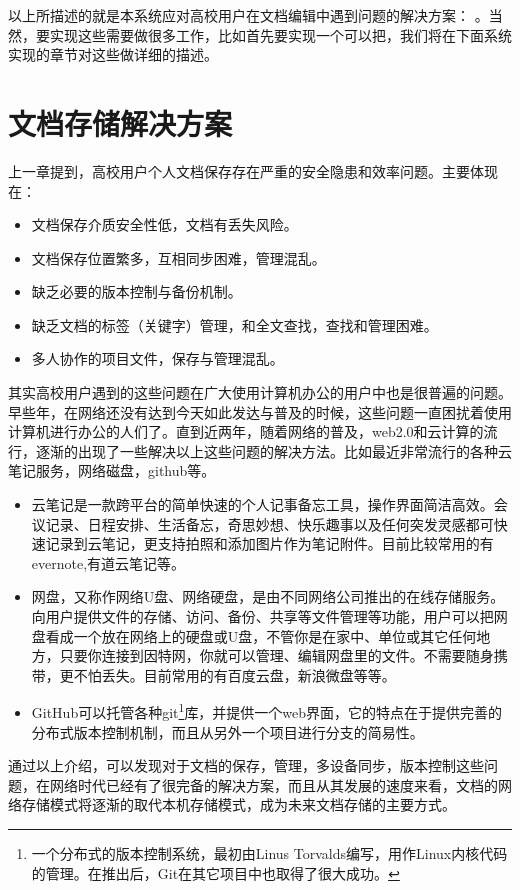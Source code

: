 以上所描述的就是本系统应对高校用户在文档编辑中遇到问题的解决方案： 。当然，要实现这些需要做很多工作，比如首先要实现一个可以把，我们将在下面系统实现的章节对这些做详细的描述。


\section{文档存储解决方案}
\label{sec:save}

上一章提到，高校用户个人文档保存存在严重的安全隐患和效率问题。主要体现在：
\begin{itemize}
\item 文档保存介质安全性低，文档有丢失风险。
\item 文档保存位置繁多，互相同步困难，管理混乱。
\item 缺乏必要的版本控制与备份机制。
\item 缺乏文档的标签（关键字）管理，和全文查找，查找和管理困难。
\item 多人协作的项目文件，保存与管理混乱。
\end{itemize}
其实高校用户遇到的这些问题在广大使用计算机办公的用户中也是很普遍的问题。早些年，在网络还没有达到今天如此发达与普及的时候，这些问题一直困扰着使用计算机进行办公的人们了。直到近两年，随着网络的普及，web2.0和云计算的流行，逐渐的出现了一些解决以上这些问题的解决方法。比如最近非常流行的各种云笔记服务，网络磁盘，github等。
\begin{itemize}
\item 云笔记是一款跨平台的简单快速的个人记事备忘工具，操作界面简洁高效。会议记录、日程安排、生活备忘，奇思妙想、快乐趣事以及任何突发灵感都可快速记录到云笔记，更支持拍照和添加图片作为笔记附件。目前比较常用的有evernote,有道云笔记等。
\item 网盘，又称作网络U盘、网络硬盘，是由不同网络公司推出的在线存储服务。向用户提供文件的存储、访问、备份、共享等文件管理等功能，用户可以把网盘看成一个放在网络上的硬盘或U盘，不管你是在家中、单位或其它任何地方，只要你连接到因特网，你就可以管理、编辑网盘里的文件。不需要随身携带，更不怕丢失。目前常用的有百度云盘，新浪微盘等等。
\item GitHub可以托管各种git\footnote{一个分布式的版本控制系统，最初由Linus Torvalds编写，用作Linux内核代码的管理。在推出后，Git在其它项目中也取得了很大成功。}库，并提供一个web界面，它的特点在于提供完善的分布式版本控制机制，而且从另外一个项目进行分支的简易性。
\end{itemize}
通过以上介绍，可以发现对于文档的保存，管理，多设备同步，版本控制这些问题，在网络时代已经有了很完备的解决方案，而且从其发展的速度来看，文档的网络存储模式将逐渐的取代本机存储模式，成为未来文档存储的主要方式。

